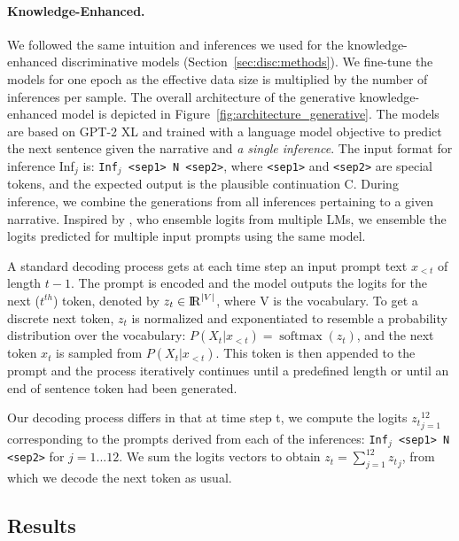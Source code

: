 \paragraph{Knowledge-Enhanced.} We followed the same intuition and inferences we used for the knowledge-enhanced discriminative models (Section~\ref{sec:disc:methods}). We fine-tune the models for one epoch as the effective data size is multiplied by the number of inferences per sample. The overall architecture of the generative knowledge-enhanced model is depicted in Figure~\ref{fig:architecture_generative}. The models are based on GPT-2 XL and trained with a language model objective to predict the next sentence given the narrative and \emph{a single inference}. The input format for inference Inf$_j$ is: \texttt{Inf$_j$ <sep1> N <sep2>}, where \texttt{<sep1>} and \texttt{<sep2>} are special tokens, and the expected output is the plausible continuation C. During inference, we combine the generations from all inferences pertaining to a given narrative. Inspired by , who ensemble logits from multiple LMs, we ensemble the logits predicted for multiple input prompts using the same model. 

A standard decoding process gets at each time step an input prompt text $x_{\lt t}$ of length $t-1$. The prompt is encoded and the model outputs the logits for the next ($t^{th}$) token, denoted by $z_{t} \in {\rm I\!R}^{|V|}$, where V is the vocabulary. To get a discrete next token, $z_{t}$ is normalized and exponentiated to resemble a probability distribution over the vocabulary: $P(X_t|x_{\lt t}) = \operatorname{softmax}(z_t)$, and the next token $x_{t}$ is sampled from $P(X_{t}|x_{<t})$. This token is then appended to the prompt and the process iteratively continues until a predefined length or until an end of sentence token had been generated.

Our decoding process differs in that at time step t, we compute the logits ${z_t}_{j=1}^{12}$ corresponding to the prompts derived from each of the inferences: \texttt{Inf$_j$ <sep1> N <sep2>} for $j = 1 ... 12$. We sum the logits vectors to obtain $z_t = \sum_{j=1}^{12} {z_t}_{j}$, from which we decode the next token as usual.



\subsection{Results}
\label{sec:generative:results}

